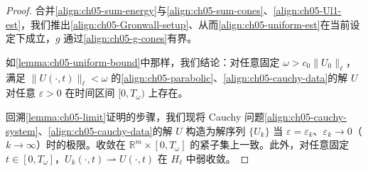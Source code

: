 \documentclass[../../main.tex]{subfiles}
\begin{document}
\begin{proof}
合并\eqref{align:ch05-sum-energy}与\eqref{align:ch05-sum-cones}、\eqref{align:ch05-Ul1-est}，我们推出\eqref{align:ch05-Gronwall-setup}、从而\eqref{align:ch05-uniform-est}在当前设定下成立，$g$ 通过\eqref{align:ch05-g-cones}有界。

如\cref{lemma:ch05-uniform-bound}中那样，我们结论：对任意固定 $\omega>c_{0}\|U_{0}\|_{\ell}$，满足 $\|U(\cdot,t)\|_{\ell}<\omega$ 的\eqref{align:ch05-parabolic}、\eqref{align:ch05-cauchy-data}的解 $U$ 对任意 $\varepsilon>0$ 在时间区间 $[0,T_{\omega})$ 上存在。

回溯\cref{lemma:ch05-limit}证明的步骤，我们现将 Cauchy 问题\eqref{align:ch05-cauchy-system}、\eqref{align:ch05-cauchy-data}的解 $U$ 构造为解序列 $\{U_{k}\}$ 当 $\varepsilon=\varepsilon_{k}$、$\varepsilon_{k}\to0$（$k\to\infty$）时的极限。收敛在 $\mathbb{R}^{m}\times[0,T_{\omega}]$ 的紧子集上一致。此外，对任意固定 $t\in[0,T_{\omega}]$，$U_{k}(\cdot,t)\rightharpoonup U(\cdot,t)$ 在 $H_{\ell}$ 中弱收敛。


\end{proof}
\end{document}
